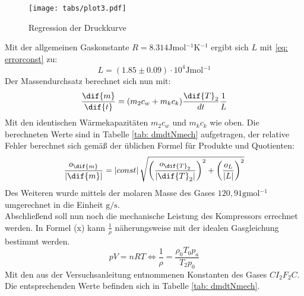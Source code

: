 \begin{figure}
  \centering
  \texttt{[image: tabs/plot3.pdf]}
  \caption{Regression der Druckkurve}
  \label{fig: plot3}
\end{figure}

Mit der allgemeinen Gaskonstante $R = 8.314\si{\joule \mol^{-1} \kelvin^{-1}}$ ergibt sich $L$  mit \eqref{eq: errorconst} zu: %
\begin{equation}
  L = (1.85 \pm 0.09)\cdot 10^{4} \si{\joule \mol^{-1}} %
\end{equation}
Der Massendurchsatz berechnet sich nun mit:
\begin{equation}
  \frac{\dif{m}}{\dif{t}} = (m_2 c_w + m_k c_k)\frac{\dif{T}_2}{dt} \frac{1}{L}
\end{equation}
Mit den identischen Wärmekapazitäten $m_2 c_w$ und $m_k c_k$ wie oben. Die berechneten Werte sind in Tabelle \ref{tab: dmdtNmech} aufgetragen, der relative Fehler berechnet sich gemäß der üblichen Formel
für Produkte und Quotienten:
\begin{equation}
  \frac{o_{\dif{m}}}{\left| \dif{m} \right|} = \left| const \right| \sqrt{\left(\frac{o_{\dif{T}_2}}{\left| \dif{T}_2 \right|}\right)^2 + \left(\frac{o_{L}}{\left| L \right|}\right)^2} %
\end{equation}
Des Weiteren wurde mittels der molaren Masse des Gases $120,91 \si{\gram \mol ^{-1}}$ \cite{demtröder} umgerechnet in die Einheit $\si{\gram \per \second}$. \\%
Abschließend soll nun noch die mechanische Leistung des Kompressors errechnet werden. In Formel (x) kann $\frac{1}{\rho}$
näherungsweise mit der idealen Gasgleichung bestimmt werden.
\begin{equation}
  pV = nRT \Leftrightarrow  \frac{1}{\rho} = \frac{\rho_0 T_0 p_a}{T_2 p_0}
\end{equation}
Mit den aus der Versuchsanleitung \cite{anleitung206} entnommenen Konstanten des Gases $CI_2F_2C$. Die entsprechenden Werte befinden sich in Tabelle \ref{tab: dmdtNmech}.






